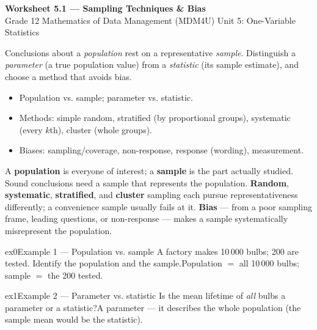 \documentclass[11pt]{article}
\begin{document}
\begin{center}
{\LARGE\bfseries\color{titleblue}Worksheet 5.1 --- Sampling Techniques \& Bias}\\[2pt]
{\small Grade 12 Mathematics of Data Management (MDM4U) \textperiodcentered{} Unit 5: One-Variable Statistics}
\end{center}

\begin{ideabox}
Conclusions about a \emph{population} rest on a representative \emph{sample}. Distinguish a \emph{parameter} (a true population value) from a \emph{statistic} (its sample estimate), and choose a method that avoids bias.
\begin{itemize}[leftmargin=*,itemsep=2pt]
  \item Population vs. sample; parameter vs. statistic.
  \item Methods: simple random, stratified (by proportional groups), systematic (every $k$th), cluster (whole groups).
  \item Biases: sampling/coverage, non-response, response (wording), measurement.
\end{itemize}
\end{ideabox}

\begin{learnbox}
A \textbf{population} is everyone of interest; a \textbf{sample} is the part actually studied. Sound conclusions need a sample that represents the population.
\textbf{Random}, \textbf{systematic}, \textbf{stratified}, and \textbf{cluster} sampling each pursue representativeness differently; a convenience sample usually fails at it.
\textbf{Bias} — from a poor sampling frame, leading questions, or non-response — makes a sample systematically misrepresent the population.
\end{learnbox}


\begin{example}{ex0}{Example 1 --- Population vs. sample}
A factory makes 10\,000 bulbs; 200 are tested. Identify the population and the sample.\soln Population $=$ all 10\,000 bulbs; sample $=$ the 200 tested.
\end{example}

\begin{example}{ex1}{Example 2 --- Parameter vs. statistic}
Is the mean lifetime of \emph{all} bulbs a parameter or a statistic?\soln A parameter --- it describes the whole population (the sample mean would be the statistic).
\end{example}
\end{document}
